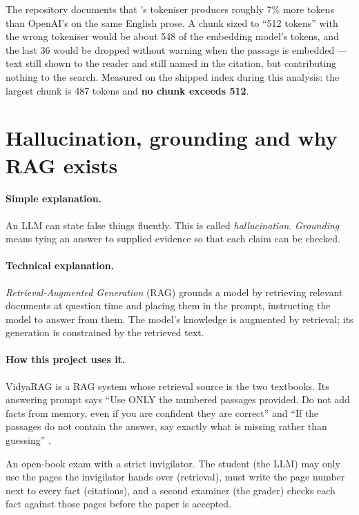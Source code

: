 \begin{keyidea}
The repository documents that 's tokeniser produces roughly 7\% more tokens than OpenAI's  on the same English prose. A chunk sized to ``512 tokens'' with the wrong tokeniser would be about 548 of the embedding model's tokens, and the last 36 would be dropped without warning when the passage is embedded --- text still shown to the reader and still named in the citation, but contributing nothing to the search. Measured on the shipped index during this analysis: the largest chunk is 487 tokens and \textbf{no chunk exceeds 512}.
\end{keyidea}

\section{Hallucination, grounding and why RAG exists}

\paragraph{Simple explanation.} An LLM can state false things fluently. This is called \emph{hallucination}. \emph{Grounding} means tying an answer to supplied evidence so that each claim can be checked.

\paragraph{Technical explanation.} \emph{Retrieval-Augmented Generation} (RAG) grounds a model by retrieving relevant documents at question time and placing them in the prompt, instructing the model to answer from them. The model's knowledge is augmented by retrieval; its generation is constrained by the retrieved text.

\paragraph{How this project uses it.} VidyaRAG is a RAG system whose retrieval source is the two textbooks. Its answering prompt says \enquote{Use ONLY the numbered passages provided. Do not add facts from memory, even if you are confident they are correct} and \enquote{If the passages do not contain the answer, say exactly what is missing rather than guessing} .

\begin{analogy}
An open-book exam with a strict invigilator. The student (the LLM) may only use the pages the invigilator hands over (retrieval), must write the page number next to every fact (citations), and a second examiner (the grader) checks each fact against those pages before the paper is accepted.
\end{analogy}

